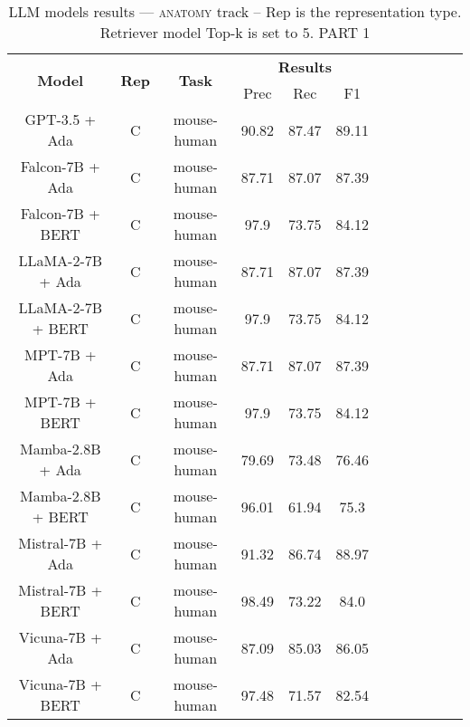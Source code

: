 \begin{table}
        \centering
        \small
        \caption{LLM models results --- \textsc{anatomy} track -- Rep is the representation type. Retriever model Top-k is set to 5. PART 1 } \label{tab:llm_anatomy1}
        \begin{tabular}{|c|c|c|c|c|c|c|c|c|c|c|c|}
            \hline
             \multirow{2}{*}{\textbf{Model}}  & \multirow{2}{*}{\textbf{Rep}}  & \multirow{2}{*}{\textbf{Task}} &  \multicolumn{3}{c|}{\textbf{Results}} \\
             \cline{4-6}
              & & & Prec & Rec & F1  \\
            \hline
	GPT-3.5 + Ada  & C & mouse-human  &  90.82 &  87.47 & 89.11  \\
	Falcon-7B + Ada  & C & mouse-human  &  87.71 &  87.07 & 87.39  \\
	Falcon-7B + BERT  & C & mouse-human  &  97.9 &  73.75 & 84.12  \\
	LLaMA-2-7B + Ada  & C & mouse-human  &  87.71 &  87.07 & 87.39  \\
	LLaMA-2-7B + BERT  & C & mouse-human  &  97.9 &  73.75 & 84.12  \\
	MPT-7B + Ada  & C & mouse-human  &  87.71 &  87.07 & 87.39  \\
	MPT-7B + BERT  & C & mouse-human  &  97.9 &  73.75 & 84.12  \\
	Mamba-2.8B + Ada  & C & mouse-human  &  79.69 &  73.48 & 76.46  \\
	Mamba-2.8B + BERT  & C & mouse-human  &  96.01 &  61.94 & 75.3  \\
	Mistral-7B + Ada  & C & mouse-human  &  91.32 &  86.74 & 88.97  \\
	Mistral-7B + BERT  & C & mouse-human  &  98.49 &  73.22 & 84.0  \\
	Vicuna-7B + Ada  & C & mouse-human  &  87.09 &  85.03 & 86.05  \\
	Vicuna-7B + BERT  & C & mouse-human  &  97.48 &  71.57 & 82.54  \\
	\hline
\end{tabular}
    \end{table}








